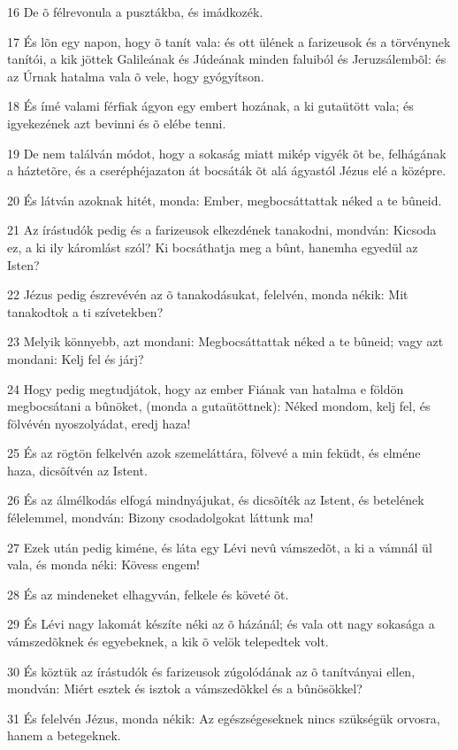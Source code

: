 \par 16 De õ félrevonula a pusztákba, és imádkozék.
\par 17 És lõn egy napon, hogy õ tanít vala: és ott ülének a farizeusok és a törvénynek tanítói, a kik jöttek Galileának és Júdeának minden faluiból és Jeruzsálembõl: és az Úrnak hatalma vala õ vele, hogy gyógyítson.
\par 18 És ímé valami férfiak ágyon egy embert hozának, a ki gutaütött vala; és igyekezének azt bevinni és õ elébe tenni.
\par 19 De nem találván módot, hogy a sokaság miatt mikép vigyék õt be, felhágának a háztetõre, és a cseréphéjazaton át bocsáták õt alá ágyastól Jézus elé a középre.
\par 20 És látván azoknak hitét, monda: Ember, megbocsáttattak néked a te bûneid.
\par 21 Az írástudók pedig és a farizeusok elkezdének tanakodni, mondván: Kicsoda ez, a ki ily káromlást szól? Ki bocsáthatja meg a bûnt, hanemha egyedül az Isten?
\par 22 Jézus pedig észrevévén az õ tanakodásukat, felelvén, monda nékik: Mit tanakodtok a ti szívetekben?
\par 23 Melyik könnyebb, azt mondani: Megbocsáttattak néked a te bûneid; vagy azt mondani: Kelj fel és járj?
\par 24 Hogy pedig megtudjátok, hogy az ember Fiának van hatalma e földön megbocsátani a bûnöket, (monda a gutaütöttnek): Néked mondom, kelj fel, és fölvévén nyoszolyádat, eredj haza!
\par 25 És az rögtön felkelvén azok szemeláttára, fölvevé a min feküdt, és elméne haza, dicsõítvén az Istent.
\par 26 És az álmélkodás elfogá mindnyájukat, és dicsõíték az Istent, és betelének félelemmel, mondván: Bizony csodadolgokat láttunk ma!
\par 27 Ezek után pedig kiméne, és láta egy Lévi nevû vámszedõt, a ki a vámnál ül vala, és monda néki: Kövess engem!
\par 28 És az mindeneket elhagyván, felkele és követé õt.
\par 29 És Lévi nagy lakomát készíte néki az õ házánál; és vala ott nagy sokasága a vámszedõknek és egyebeknek, a kik õ velök telepedtek volt.
\par 30 És köztük az írástudók és farizeusok zúgolódának az õ tanítványai ellen, mondván: Miért esztek és isztok a vámszedõkkel és a bûnösökkel?
\par 31 És felelvén Jézus, monda nékik: Az egészségeseknek nincs szükségük orvosra, hanem a betegeknek.
